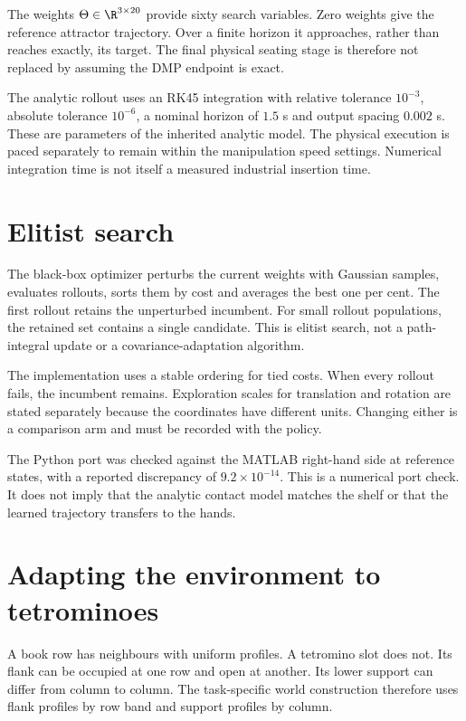 The weights $\Theta\in\R^{3\times20}$ provide sixty search variables. Zero weights give the reference attractor trajectory. Over a finite horizon it approaches, rather than reaches exactly, its target. The final physical seating stage is therefore not replaced by assuming the DMP endpoint is exact.

The analytic rollout uses an RK45 integration with relative tolerance $10^{-3}$, absolute tolerance $10^{-6}$, a nominal horizon of $1.5$ s and output spacing $0.002$ s. These are parameters of the inherited analytic model. The physical execution is paced separately to remain within the manipulation speed settings. Numerical integration time is not itself a measured industrial insertion time.

\section{Elitist search}

The black-box optimizer perturbs the current weights with Gaussian samples, evaluates rollouts, sorts them by cost and averages the best one per cent. The first rollout retains the unperturbed incumbent. For small rollout populations, the retained set contains a single candidate. This is elitist search, not a path-integral update or a covariance-adaptation algorithm.

The implementation uses a stable ordering for tied costs. When every rollout fails, the incumbent remains. Exploration scales for translation and rotation are stated separately because the coordinates have different units. Changing either is a comparison arm and must be recorded with the policy.

The Python port was checked against the MATLAB right-hand side at reference states, with a reported discrepancy of $9.2\times10^{-14}$. This is a numerical port check. It does not imply that the analytic contact model matches the shelf or that the learned trajectory transfers to the hands.

\section{Adapting the environment to tetrominoes}

A book row has neighbours with uniform profiles. A tetromino slot does not. Its flank can be occupied at one row and open at another. Its lower support can differ from column to column. The task-specific world construction therefore uses flank profiles by row band and support profiles by column.

